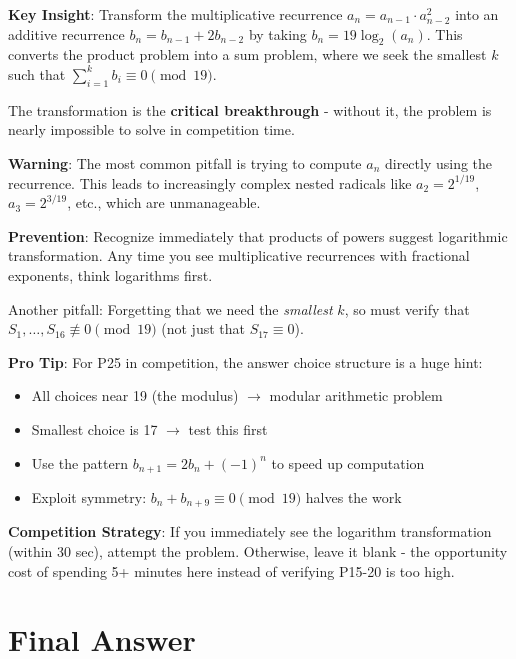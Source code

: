 \documentclass[11pt]{article}
\begin{document}
\begin{keyinsightbox}
\textbf{Key Insight}: Transform the multiplicative recurrence $a_n = a_{n-1} \cdot a_{n-2}^2$ into an additive recurrence $b_n = b_{n-1} + 2b_{n-2}$ by taking $b_n = 19\log_2(a_n)$. This converts the product problem into a sum problem, where we seek the smallest $k$ such that $\sum_{i=1}^{k} b_i \equiv 0 \pmod{19}$.

The transformation is the \textbf{critical breakthrough} - without it, the problem is nearly impossible to solve in competition time.
\end{keyinsightbox}

\begin{warningbox}
\textbf{Warning}: The most common pitfall is trying to compute $a_n$ directly using the recurrence. This leads to increasingly complex nested radicals like $a_2 = 2^{1/19}$, $a_3 = 2^{3/19}$, etc., which are unmanageable.

\textbf{Prevention}: Recognize immediately that products of powers suggest logarithmic transformation. Any time you see multiplicative recurrences with fractional exponents, think logarithms first.

Another pitfall: Forgetting that we need the \emph{smallest} $k$, so must verify that $S_1, \ldots, S_{16} \not\equiv 0 \pmod{19}$ (not just that $S_{17} \equiv 0$).
\end{warningbox}

\begin{tipbox}
\textbf{Pro Tip}: For P25 in competition, the answer choice structure is a huge hint:
\begin{itemize}
    \item All choices near 19 (the modulus) $\rightarrow$ modular arithmetic problem
    \item Smallest choice is 17 $\rightarrow$ test this first
    \item Use the pattern $b_{n+1} = 2b_n + (-1)^n$ to speed up computation
    \item Exploit symmetry: $b_n + b_{n+9} \equiv 0 \pmod{19}$ halves the work
\end{itemize}

\textbf{Competition Strategy}: If you immediately see the logarithm transformation (within 30 sec), attempt the problem. Otherwise, leave it blank - the opportunity cost of spending 5+ minutes here instead of verifying P15-20 is too high.
\end{tipbox}

\section*{Final Answer}
\end{document}
